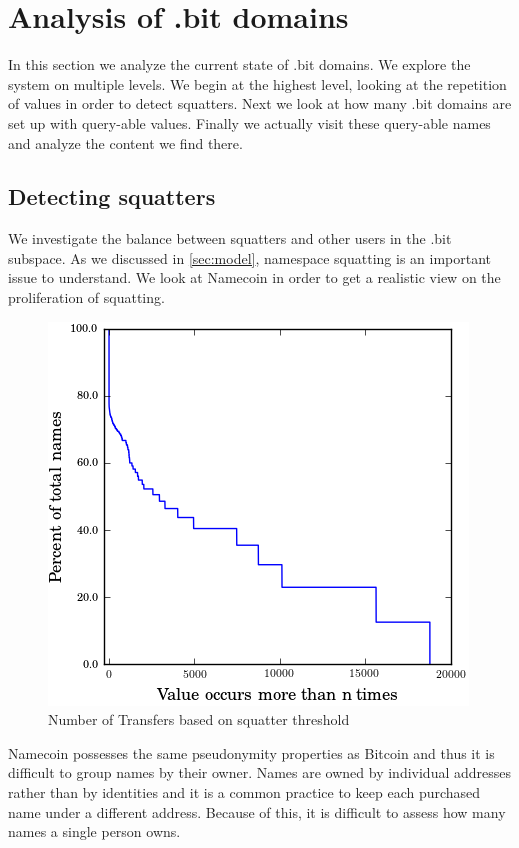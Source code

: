 \section{Analysis of .bit domains}
\label{sec:domains}

In this section we analyze the current state of .bit domains. We explore the system on multiple levels. We begin at the highest level, looking at the repetition of values in order to detect squatters. Next we look at how many .bit domains are set up with query-able values. Finally we actually visit these query-able names and analyze the content we find there.

\subsection{Detecting squatters}

We investigate the balance between squatters and other users in the .bit subspace. As we discussed in \ref{sec:model}, namespace squatting is an important issue to understand. We look at Namecoin in order to get a realistic view on the proliferation of squatting.

\begin{figure}
  \centering
  \includegraphics[width=0.9\columnwidth]{figures/squatters}
  \caption{Number of Transfers based on squatter threshold}
  \label{fig:percentSquatter}
\end{figure}

Namecoin possesses the same pseudonymity properties as Bitcoin and thus it is difficult to group names by their owner. Names are owned by individual addresses rather than by identities and it is a common practice to keep each purchased name under a different address. Because of this, it is difficult to assess how many names a single person owns. 

